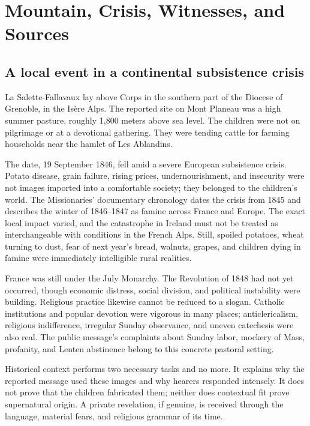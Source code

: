 \section{Mountain, Crisis, Witnesses, and Sources}

\subsection{A local event in a continental subsistence crisis}

La Salette-Fallavaux lay above Corps in the southern part of the Diocese of Grenoble, in the Isère Alps. The reported site on Mont Planeau was a high summer pasture, roughly 1,800 meters above sea level. The children were not on pilgrimage or at a devotional gathering. They were tending cattle for farming households near the hamlet of Les Ablandins.

The date, 19 September 1846, fell amid a severe European subsistence crisis. Potato disease, grain failure, rising prices, undernourishment, and insecurity were not images imported into a comfortable society; they belonged to the children's world. The Missionaries' documentary chronology dates the crisis from 1845 and describes the winter of 1846--1847 as famine across France and Europe. The exact local impact varied, and the catastrophe in Ireland must not be treated as interchangeable with conditions in the French Alps. Still, spoiled potatoes, wheat turning to dust, fear of next year's bread, walnuts, grapes, and children dying in famine were immediately intelligible rural realities.

France was still under the July Monarchy. The Revolution of 1848 had not yet occurred, though economic distress, social division, and political instability were building. Religious practice likewise cannot be reduced to a slogan. Catholic institutions and popular devotion were vigorous in many places; anticlericalism, religious indifference, irregular Sunday observance, and uneven catechesis were also real. The public message's complaints about Sunday labor, mockery of Mass, profanity, and Lenten abstinence belong to this concrete pastoral setting.

Historical context performs two necessary tasks and no more. It explains why the reported message used these images and why hearers responded intensely. It does not prove that the children fabricated them; neither does contextual fit prove supernatural origin. A private revelation, if genuine, is received through the language, material fears, and religious grammar of its time.

